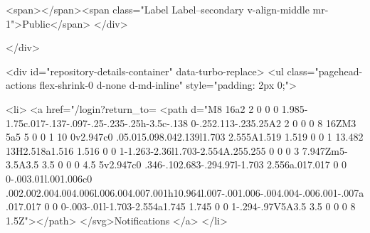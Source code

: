     <span></span><span class="Label Label--secondary v-align-middle mr-1">Public</span>
  </div>


        </div>

        <div id="repository-details-container" data-turbo-replace>
            <ul class="pagehead-actions flex-shrink-0 d-none d-md-inline" style="padding: 2px 0;">
    
      

  <li>
            <a href="/login?return_to=%
    <path d="M8 16a2 2 0 0 0 1.985-1.75c.017-.137-.097-.25-.235-.25h-3.5c-.138 0-.252.113-.235.25A2 2 0 0 0 8 16ZM3 5a5 5 0 0 1 10 0v2.947c0 .05.015.098.042.139l1.703 2.555A1.519 1.519 0 0 1 13.482 13H2.518a1.516 1.516 0 0 1-1.263-2.36l1.703-2.554A.255.255 0 0 0 3 7.947Zm5-3.5A3.5 3.5 0 0 0 4.5 5v2.947c0 .346-.102.683-.294.97l-1.703 2.556a.017.017 0 0 0-.003.01l.001.006c0 .002.002.004.004.006l.006.004.007.001h10.964l.007-.001.006-.004.004-.006.001-.007a.017.017 0 0 0-.003-.01l-1.703-2.554a1.745 1.745 0 0 1-.294-.97V5A3.5 3.5 0 0 0 8 1.5Z"></path>
</svg>Notifications
</a>  </li>

